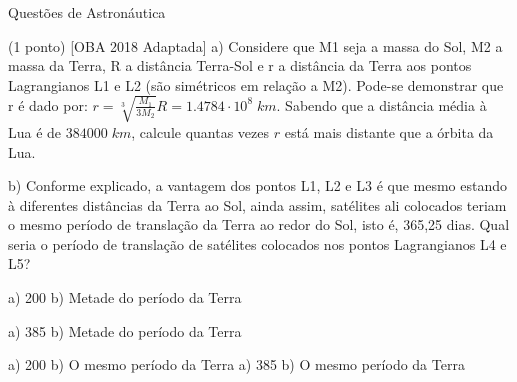 \documentclass{../lista}
\begin{document}
\begin{secao}{Questões de Astronáutica}
\begin{questao}{(1 ponto) [OBA 2018 Adaptada]}
			a) Considere que M1 seja a massa do Sol, M2 a massa da Terra, R a distância Terra-Sol e r a distância da Terra aos pontos Lagrangianos L1 e L2 (são simétricos em relação a M2). Pode-se demonstrar que r é dado por: $ r = \sqrt[3]{\frac{M_{1}}{3 M_{2}}} R = 1.4784 \cdot 10^{8} \; km$. Sabendo que a distância média à Lua é de $384000 \; km$, calcule quantas vezes $r$ está mais distante que a órbita da Lua.
			
			b) Conforme explicado, a vantagem dos pontos L1, L2 e L3 é que mesmo
			estando à diferentes distâncias da Terra ao Sol, ainda assim, satélites ali colocados teriam o mesmo período de translação da Terra ao redor do Sol, isto é, 365,25 dias. Qual seria o período de translação de satélites colocados nos pontos Lagrangianos L4 e L5?
			
			
			\begin{alternativas}
				\item a) 200 b) Metade do período da Terra
				\item a) 385 b) Metade do período da Terra
				\item a) 200 b) O mesmo período da Terra
				\alternativaMarcada a) 385 b) O mesmo período da Terra
			\end{alternativas}
			
		\end{questao}
	\end{secao}
\end{document}
